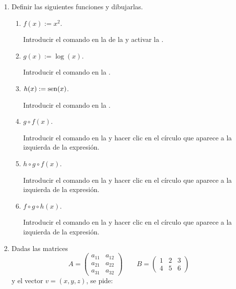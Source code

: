 \begin{enumerate}
\item Definir las siguientes funciones y dibujarlas.
      \begin{enumerate}
      \item $f(x):=x^2$.
            \begin{indication}
            Introducir el comando  en la  de la  y activar la .
            \end{indication}
      \item $g(x):=\log(x)$.
            \begin{indication}
            Introducir el comando  en la .
            \end{indication}
      \item $h(x):=\operatorname{sen}(x)$.
            \begin{indication}
            Introducir el comando  en la .
            \end{indication}
      \item $g\circ f(x)$.
            \begin{indication}
            Introducir el comando  en la  y hacer clic en el círculo que aparece a la izquierda de la expresión.
            \end{indication}
      \item $h\circ g \circ f(x)$.
            \begin{indication}
            Introducir el comando  en la  y hacer clic en el círculo que aparece a la izquierda de la expresión.
            \end{indication}
      \item $f\circ g \circ h(x)$.
            \begin{indication}
            Introducir el comando  en la  y hacer clic en el círculo que aparece a la izquierda de la expresión.
            \end{indication}
      \end{enumerate}

\item  Dadas las matrices
      \[
      A=\left(
      \begin{array}{cc}
      a_{11} & a_{12} \\
      a_{21} & a_{22} \\
      a_{31} & a_{32}
      \end{array}
      \right)
      \qquad
      B=\left(
      \begin{array}{ccc}
      1 & 2 & 3 \\
      4 & 5 & 6
      \end{array}
      \right)
      \]
      y el vector $v=(x, y, z)$, se pide:


\end{enumerate}
